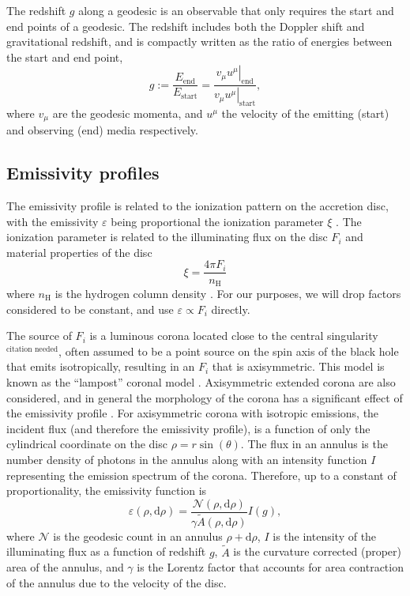 \documentclass[fleqn,usenatbib]{mnras}
\newcommand{\citneeded}{{\bf \color{red} $^{\text{citation needed}}$}}
\renewcommand{\d}{\text{d}}
\begin{document}
The redshift $g$ along a geodesic is an observable that only requires the start
and end points of a geodesic. The redshift includes both the Doppler shift and
gravitational redshift, and is compactly written as the ratio of energies
between the start and end point,
\begin{equation}
\label{eq:redshift}
g := \frac{E_\text{end}}{E_\text{start}} = \frac{\left. v_\mu u^\mu
\right\rvert_\text{end}}{\left. v_\mu u^\mu \right\rvert_{\text{start}}},
\end{equation}
where $v_\mu$ are the geodesic momenta, and $u^\mu$ the velocity of the emitting
(start) and observing (end) media respectively.



\subsection{Emissivity profiles}
\label{sec:emissivity-profiles}

The emissivity profile is related to the ionization pattern on the accretion
disc, with the emissivity $\varepsilon$ being proportional the ionization
parameter $\xi$ \citep{laor_line_1991,wilkins_understanding_2012}. The
ionization parameter is related to the illuminating flux on the disc $F_i$ and
material properties of the disc
\begin{equation}
    \xi = \frac{4 \pi F_i}{n_\text{H}}
\end{equation}
where $n_\text{H}$ is the hydrogen column density \citep{ross_effects_1993}. For
our purposes, we will drop factors considered to be constant, and use
$\varepsilon \propto F_i$ directly.

The source of $F_i$ is a luminous corona located close to the central
singularity\citneeded, often assumed to be a point source on the spin axis of
the black hole that emits isotropically, resulting in an $F_i$ that is
axisymmetric. This model is known as the ``lampost'' coronal model
\citep{fukumura_accretion_2007}. Axisymmetric extended corona are also
considered, and in general the morphology of the corona has a significant effect
of the emissivity profile \citep{wilkins_towards_2016, gonzalez_probing_2017}.
For axisymmetric corona with isotropic emissions, the incident flux (and
therefore the emissivity profile), is a function of only the cylindrical
coordinate on the disc $\rho = r \sin(\theta)$. The flux in an annulus is the
number density of photons in the annulus along with an intensity function $I$
representing the emission spectrum of the corona.  Therefore, up to a constant
of proportionality, the emissivity function is
\begin{equation}
    \varepsilon (\rho, \d \rho) = \frac{\mathcal{N}(\rho, \d \rho)}{\gamma
    \tilde{A}(\rho, \d \rho)} I(g),
\end{equation}
where $\mathcal{N}$ is the geodesic count in an annulus $\rho + \d \rho$, $I$ is
the intensity of the illuminating flux as a function of redshift $g$,
$\tilde{A}$ is the curvature corrected (proper) area of the annulus, and
$\gamma$ is the Lorentz factor that accounts for area contraction of the annulus
due to the velocity of the disc.
\end{document}
